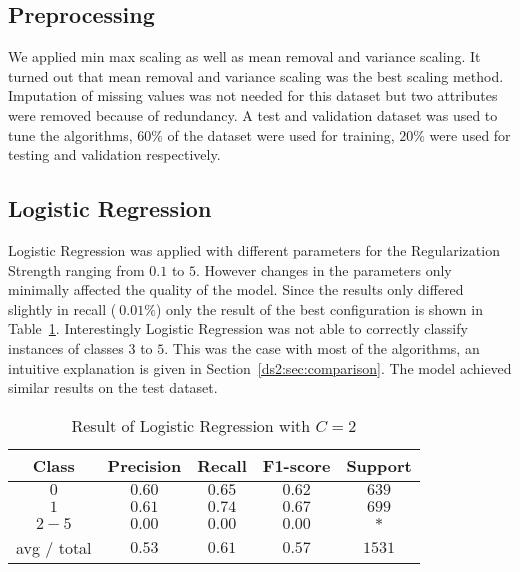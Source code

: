 \subsection{Preprocessing}
We applied min max scaling as well as mean removal and variance scaling. It turned out that mean removal and variance scaling was the best scaling method. Imputation of missing values was not needed for this dataset but two attributes were removed because of redundancy. A test and validation dataset was used to tune the algorithms, $60\%$ of the dataset were used for training, $20\%$ were used for testing and validation respectively. 
\subsection{Logistic Regression}
Logistic Regression was applied with different parameters for the Regularization Strength ranging from $0.1$ to $5$. However changes in the parameters only minimally affected the quality of the model. Since the results only differed slightly in recall ($~0.01\%$) only the result of the best configuration is shown in Table~\ref{ds2:table:lr}. Interestingly Logistic Regression was not able to correctly classify instances of classes $3$ to $5$. This was the case with most of the algorithms, an intuitive explanation is given in Section~\ref{ds2:sec:comparison}. The model achieved similar results on the test dataset.

\begin{table}[p]
\begin{center}
\begin{tabular}{|c|c|c|c|c|}
\hline Class & Precision & Recall & F1-score & Support \\
\hline  $0$    &   $0.60$    & $ 0.65$  &   $ 0.62$  &     $639$ \\
\hline  $1$    &   $0.61$    &  $0.74$  &   $ 0.67$  &     $699$ \\
\hline  $2-5$  &   $0.00$    &  $0.00$  &    $0.00$  &     $*$ \\
\hline avg / total &      $0.53$  &    $0.61$  &    $0.57$  &   $1531$\\
\hline
\end{tabular}

\caption{Result of Logistic Regression with $C=2$}
\label{ds2:table:lr}
\end{center}
\end{table}



